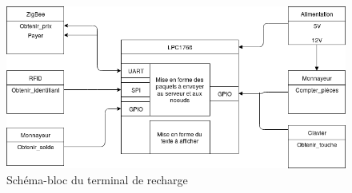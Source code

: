 	\begin{figure}[p]
		\includegraphics[width=\textwidth]{Pictures/Branchements/Recharge_Bloc}
		\caption{Schéma-bloc du terminal de recharge}
		\label{fig.blocRecharge}
	\end{figure}

	
	